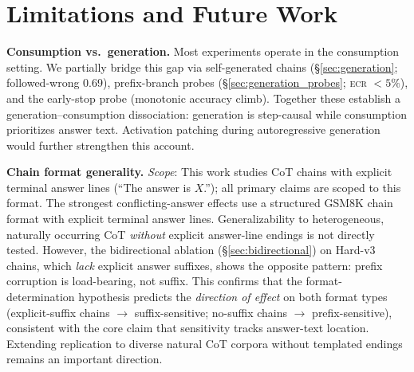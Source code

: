\documentclass{article}
\theoremstyle{definition}
\theoremstyle{definition}
\newcommand{\SGCCFW}{0.69}
\begin{document}
\section{Limitations and Future Work}
\label{sec:limitations}

\textbf{Consumption vs.\ generation.}
Most experiments operate in the consumption setting. We partially bridge
this gap via self-generated chains (\S\ref{sec:generation}; followed-wrong
\SGCCFW), prefix-branch probes (\S\ref{sec:generation_probes}; \textsc{ecr}
$< 5\%$), and the early-stop probe (monotonic accuracy climb). Together
these establish a generation--consumption dissociation: generation is
step-causal while consumption prioritizes answer text.
Activation patching during autoregressive generation would further
strengthen this account.

\textbf{Chain format generality.}
\emph{Scope}: This work studies CoT chains with explicit terminal answer lines
(``The answer is $X$.''); all primary claims are scoped to this format.
The strongest conflicting-answer effects use a structured GSM8K chain
format with explicit terminal answer lines.
Generalizability to heterogeneous, naturally occurring CoT \emph{without}
explicit answer-line endings is not directly tested. However, the
bidirectional ablation (\S\ref{sec:bidirectional}) on Hard-v3 chains, which
\emph{lack} explicit answer suffixes, shows the opposite pattern: prefix
corruption is load-bearing, not suffix. This confirms that the
format-determination hypothesis predicts the \emph{direction of effect} on
both format types (explicit-suffix chains $\to$ suffix-sensitive; no-suffix
chains $\to$ prefix-sensitive), consistent with the core claim that sensitivity
tracks answer-text location. Extending replication to diverse natural CoT corpora
without templated endings remains an important direction.
\end{document}
